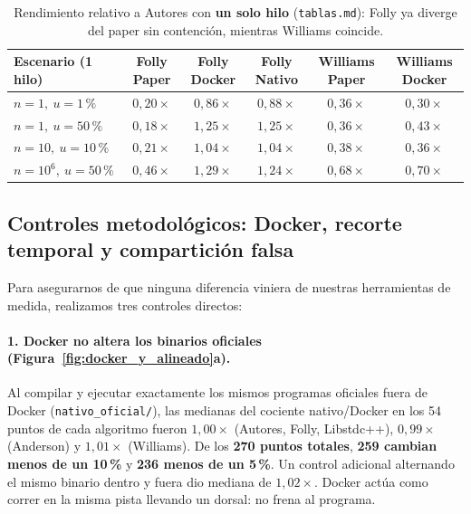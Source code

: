\documentclass[11pt,a4paper]{article}
\begin{document}
\begin{table}[H]
\centering
\caption{Rendimiento relativo a Autores con \textbf{un solo hilo} (\texttt{tablas.md}): Folly ya diverge del paper sin contención, mientras Williams coincide.}
\label{tab:folly_1hilo}
\footnotesize
\setlength{\tabcolsep}{5pt}
\begin{tabular}{@{}l c c c c c@{}}
\toprule
\textbf{Escenario (1 hilo)} & \textbf{Folly Paper} & \textbf{Folly Docker} & \textbf{Folly Nativo} & \textbf{Williams Paper} & \textbf{Williams Docker} \\
\midrule
$n = 1,\ u = 1\,\%$ & $0,20\times$ & $0,86\times$ & $0,88\times$ & $0,36\times$ & $0,30\times$ \\
$n = 1,\ u = 50\,\%$ & $0,18\times$ & $1,25\times$ & $1,25\times$ & $0,36\times$ & $0,43\times$ \\
$n = 10,\ u = 10\,\%$ & $0,21\times$ & $1,04\times$ & $1,04\times$ & $0,38\times$ & $0,36\times$ \\
$n = 10^6,\ u = 50\,\%$ & $0,46\times$ & $1,29\times$ & $1,24\times$ & $0,68\times$ & $0,70\times$ \\
\bottomrule
\end{tabular}
\end{table}

\subsection{Controles metodológicos: Docker, recorte temporal y compartición falsa}
\label{sec:controles_rend}
Para asegurarnos de que ninguna diferencia viniera de nuestras herramientas de medida, realizamos tres controles directos:

\paragraph{1. Docker no altera los binarios oficiales (Figura~\ref{fig:docker_y_alineado}a).}
Al compilar y ejecutar exactamente los mismos programas oficiales fuera de Docker (\texttt{nativo\_oficial/}), las medianas del cociente nativo/Docker en los 54 puntos de cada algoritmo fueron $1,00\times$ (Autores, Folly, Libstdc++), $0,99\times$ (Anderson) y $1,01\times$ (Williams). De los \textbf{270 puntos totales}, \textbf{259 cambian menos de un 10\,\%} y \textbf{236 menos de un 5\,\%}. Un control adicional alternando el mismo binario dentro y fuera dio mediana de $1,02\times$. Docker actúa como correr en la misma pista llevando un dorsal: no frena al programa.
\end{document}
